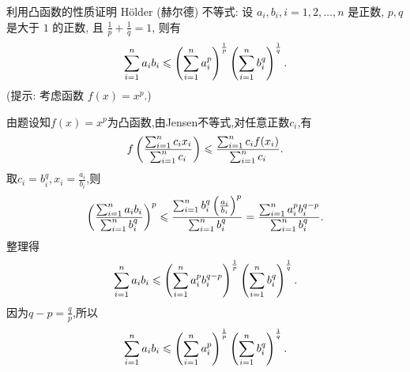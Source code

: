 \begin{exercise}[3.C.20]
    利用凸函数的性质证明 Hölder (赫尔德) 不等式: 设 $a_i, b_i, i = 1, 2, \dots, n$ 是正数, $p, q$ 是大于 $1$ 的正数, 且 $\frac{1}{p} + \frac{1}{q} = 1$, 则有
    $$\sum_{i=1}^n a_i b_i \leqslant \left(\sum_{i=1}^n a_i^p\right)^{\frac{1}{p}} \left(\sum_{i=1}^n b_i^q\right)^{\frac{1}{q}}.$$
    (提示: 考虑函数 $f(x) = x^p$.)

\begin{solution}
    由题设知$f(x) = x^p$为凸函数,由Jensen不等式,对任意正数$c_i$,有
    $$f\left(\frac{\sum_{i=1}^n c_i x_i}{\sum_{i=1}^n c_i}\right) \leqslant \frac{\sum_{i=1}^n c_i f(x_i)}{\sum_{i=1}^n c_i}.$$
    取$c_i = b_i^q, x_i = \frac{a_i}{b_i}$,则
    $$\left(\frac{\sum_{i=1}^n a_i b_i}{\sum_{i=1}^n b_i^q}\right)^p \leqslant \frac{\sum_{i=1}^n b_i^q \left(\frac{a_i}{b_i}\right)^p}{\sum_{i=1}^n b_i^q} = \frac{\sum_{i=1}^n a_i^p b_i^{q - p}}{\sum_{i=1}^n b_i^q}.$$
    整理得
    $$\sum_{i=1}^n a_i b_i \leqslant \left(\sum_{i=1}^n a_i^p b_i^{q - p}\right)^{\frac{1}{p}} \left(\sum_{i=1}^n b_i^q\right)^{\frac{1}{q}}.$$
    因为$q - p = \frac{q}{p}$,所以
    $$\sum_{i=1}^n a_i b_i \leqslant \left(\sum_{i=1}^n a_i^p\right)^{\frac{1}{p}} \left(\sum_{i=1}^n b_i^q\right)^{\frac{1}{q}}.$$
\end{solution}
\end{exercise}
